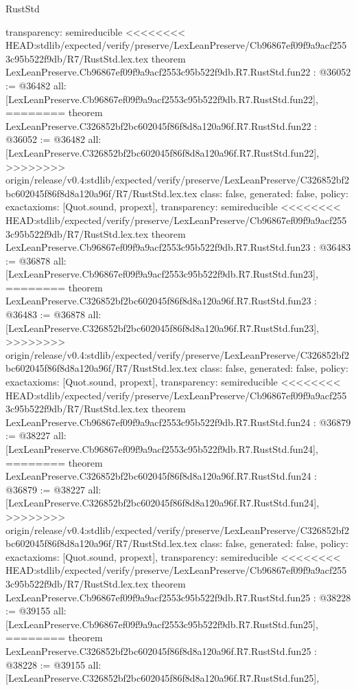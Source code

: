 \begin{lexlean}{RustStd}
\begin{coremodule}
{\begin{coremodule}
{{{{{{{{{{{{{{{{{{{{{{{{{  transparency: semireducible
}
<<<<<<<< HEAD:stdlib/expected/verify/preserve/LexLeanPreserve/Cb96867ef09f9a9acf2553c95b522f9db/R7/RustStd.lex.tex
theorem LexLeanPreserve.Cb96867ef09f9a9acf2553c95b522f9db.R7.RustStd.fun22 : @36052 := @36482 {
  all: [LexLeanPreserve.Cb96867ef09f9a9acf2553c95b522f9db.R7.RustStd.fun22],
========
theorem LexLeanPreserve.C326852bf2bc602045f86f8d8a120a96f.R7.RustStd.fun22 : @36052 := @36482 {
  all: [LexLeanPreserve.C326852bf2bc602045f86f8d8a120a96f.R7.RustStd.fun22],
>>>>>>>> origin/release/v0.4:stdlib/expected/verify/preserve/LexLeanPreserve/C326852bf2bc602045f86f8d8a120a96f/R7/RustStd.lex.tex
  class: false,
  generated: false,
  policy: exact{axioms: [Quot.sound, propext]},
  transparency: semireducible
}
<<<<<<<< HEAD:stdlib/expected/verify/preserve/LexLeanPreserve/Cb96867ef09f9a9acf2553c95b522f9db/R7/RustStd.lex.tex
theorem LexLeanPreserve.Cb96867ef09f9a9acf2553c95b522f9db.R7.RustStd.fun23 : @36483 := @36878 {
  all: [LexLeanPreserve.Cb96867ef09f9a9acf2553c95b522f9db.R7.RustStd.fun23],
========
theorem LexLeanPreserve.C326852bf2bc602045f86f8d8a120a96f.R7.RustStd.fun23 : @36483 := @36878 {
  all: [LexLeanPreserve.C326852bf2bc602045f86f8d8a120a96f.R7.RustStd.fun23],
>>>>>>>> origin/release/v0.4:stdlib/expected/verify/preserve/LexLeanPreserve/C326852bf2bc602045f86f8d8a120a96f/R7/RustStd.lex.tex
  class: false,
  generated: false,
  policy: exact{axioms: [Quot.sound, propext]},
  transparency: semireducible
}
<<<<<<<< HEAD:stdlib/expected/verify/preserve/LexLeanPreserve/Cb96867ef09f9a9acf2553c95b522f9db/R7/RustStd.lex.tex
theorem LexLeanPreserve.Cb96867ef09f9a9acf2553c95b522f9db.R7.RustStd.fun24 : @36879 := @38227 {
  all: [LexLeanPreserve.Cb96867ef09f9a9acf2553c95b522f9db.R7.RustStd.fun24],
========
theorem LexLeanPreserve.C326852bf2bc602045f86f8d8a120a96f.R7.RustStd.fun24 : @36879 := @38227 {
  all: [LexLeanPreserve.C326852bf2bc602045f86f8d8a120a96f.R7.RustStd.fun24],
>>>>>>>> origin/release/v0.4:stdlib/expected/verify/preserve/LexLeanPreserve/C326852bf2bc602045f86f8d8a120a96f/R7/RustStd.lex.tex
  class: false,
  generated: false,
  policy: exact{axioms: [Quot.sound, propext]},
  transparency: semireducible
}
<<<<<<<< HEAD:stdlib/expected/verify/preserve/LexLeanPreserve/Cb96867ef09f9a9acf2553c95b522f9db/R7/RustStd.lex.tex
theorem LexLeanPreserve.Cb96867ef09f9a9acf2553c95b522f9db.R7.RustStd.fun25 : @38228 := @39155 {
  all: [LexLeanPreserve.Cb96867ef09f9a9acf2553c95b522f9db.R7.RustStd.fun25],
========
theorem LexLeanPreserve.C326852bf2bc602045f86f8d8a120a96f.R7.RustStd.fun25 : @38228 := @39155 {
  all: [LexLeanPreserve.C326852bf2bc602045f86f8d8a120a96f.R7.RustStd.fun25],
}}}}}}}}}}}}}}}}}}}}}}}}}}}}}
\end{coremodule}}
\end{coremodule}
\end{lexlean}

